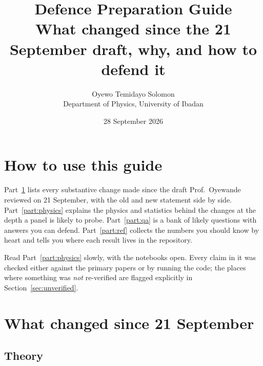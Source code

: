 \documentclass[11pt,a4paper]{article}
\title{Defence Preparation Guide\\[0.3em]
\large What changed since the 21 September draft, why, and how to defend it}
\author{Oyewo Temidayo Solomon\\ Department of Physics, University of Ibadan}
\date{28 September 2026}
\begin{document}
\maketitle
\tableofcontents
\newpage

\section*{How to use this guide}

Part~\ref{part:changes} lists every substantive change made since the
draft Prof.\ Oyewande reviewed on 21 September, with the old and new
statement side by side. Part~\ref{part:physics} explains the physics and
statistics behind the changes at the depth a panel is likely to probe.
Part~\ref{part:qa} is a bank of likely questions with answers you can
defend. Part~\ref{part:ref} collects the numbers you should know by heart
and tells you where each result lives in the repository.

Read Part~\ref{part:physics} slowly, with the notebooks open. Every
claim in it was checked either against the primary papers or by running
the code; the places where something was \emph{not} re-verified are
flagged explicitly in Section~\ref{sec:unverified}.

\section{What changed since 21 September}
\label{part:changes}

\subsection{Theory}
\end{document}
